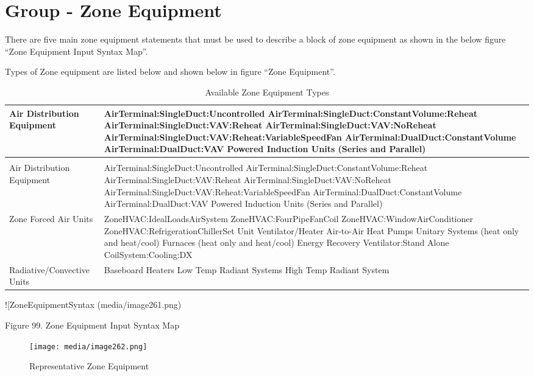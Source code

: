 \section{Group - Zone Equipment}\label{group---zone-equipment}

There are five main zone equipment statements that must be used to describe a block of zone equipment as shown in the below figure ``Zone Equipment Input Syntax Map''.

Types of Zone equipment are listed below and shown below in figure ``Zone Equipment''.

\begin{longtable}[c]{p{1.5in}p{4.5in}}
\caption{Available Zone Equipment Types \label{table:available-zone-equipment-types}} \tabularnewline
\toprule 
Air Distribution Equipment & AirTerminal:SingleDuct:Uncontrolled    AirTerminal:SingleDuct:ConstantVolume:Reheat    AirTerminal:SingleDuct:VAV:Reheat    AirTerminal:SingleDuct:VAV:NoReheat    AirTerminal:SingleDuct:VAV:Reheat:VariableSpeedFan    AirTerminal:DualDuct:ConstantVolume    AirTerminal:DualDuct:VAV    Powered Induction Units (Series and Parallel) \tabularnewline
\midrule
\endfirsthead

\caption[]{Available Zone Equipment Types} \tabularnewline
\toprule 
Air Distribution Equipment & AirTerminal:SingleDuct:Uncontrolled    AirTerminal:SingleDuct:ConstantVolume:Reheat    AirTerminal:SingleDuct:VAV:Reheat    AirTerminal:SingleDuct:VAV:NoReheat    AirTerminal:SingleDuct:VAV:Reheat:VariableSpeedFan    AirTerminal:DualDuct:ConstantVolume    AirTerminal:DualDuct:VAV    Powered Induction Units (Series and Parallel) \tabularnewline
\midrule
\endhead

Zone Forced Air Units ~ & ZoneHVAC:IdealLoadsAirSystem    ZoneHVAC:FourPipeFanCoil    ZoneHVAC:WindowAirConditioner    ZoneHVAC:RefrigerationChillerSet    Unit Ventilator/Heater    Air-to-Air Heat Pumps    Unitary Systems (heat only and heat/cool)    Furnaces (heat only and heat/cool)    Energy Recovery Ventilator:Stand Alone    CoilSystem:Cooling:DX \tabularnewline
Radiative/Convective Units & Baseboard Heaters    Low Temp Radiant Systems    High Temp Radiant System \tabularnewline
\bottomrule
\end{longtable}

!{[}ZoneEquipmentSyntax (media/image261.png)

Figure 99. Zone Equipment Input Syntax Map

\begin{figure}[hbtp] %
\centering
\texttt{[image: media/image262.png]}
\caption{Representative Zone Equipment \protect \label{fig:representative-zone-equipment}}
\end{figure}

